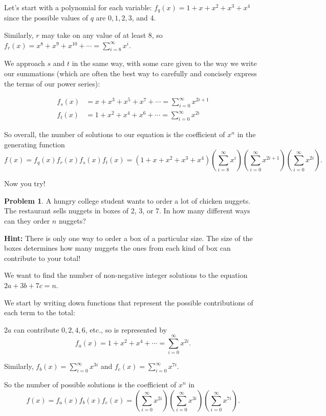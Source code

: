 \documentclass{article}
\theoremstyle{definition}
\newtheorem{problem}{Problem}
\begin{document}
Let's start with a polynomial for each variable: $f_{q}(x)=1+x+x^{2}+x^{3}+x^{4}$ since the possible values of $q$ are $0,1,2,3$, and 4.

Similarly, $r$ may take on any value of at least 8, so $f_{r}(x)=x^{8}+x^{9}+x^{10}+\cdots=\sum_{i=8}^{\infty} x^{i}$.

We approach $s$ and $t$ in the same way, with some care given to the way we write our summations (which are often the best way to carefully and concisely express the terms of our power series):

\begin{align}
f_{s}(x) &= x+x^{3}+x^{5}+x^{7}+\cdots=\sum_{i=0}^{\infty} x^{2 i+1} \\
f_{t}(x) &= 1+x^{2}+x^{4}+x^{6}+\cdots=\sum_{i=0}^{\infty} x^{2 i}
\end{align}

So overall, the number of solutions to our equation is the coefficient of $x^{n}$ in the generating function
\[f(x)=f_{q}(x) f_{r}(x) f_{s}(x) f_{t}(x)=\left(1+x+x^{2}+x^{3}+x^{4}\right)\left(\sum_{i=8}^{\infty} x^{i}\right)\left(\sum_{i=0}^{\infty} x^{2 i+1}\right)\left(\sum_{i=0}^{\infty} x^{2 i}\right).\]

Now you try!

\begin{problem}
A hungry college student wants to order a lot of chicken nuggets. The restaurant sells nuggets in boxes of 2, 3, or 7. In how many different ways can they order $n$ nuggets?

\textbf{Hint:} There is only one way to order a box of a particular size. The size of the boxes determines how many nuggets the ones from each kind of box can contribute to your total!
\end{problem}

We want to find the number of non-negative integer solutions to the equation $2a+3b+7c=n$.

We start by writing down functions that represent the possible contributions of each term to the total:

$2a$ can contribute $0,2,4,6$, etc., so is represented by
\[f_{a}(x)=1+x^{2}+x^{4}+\cdots=\sum_{i=0}^{\infty} x^{2 i}.\]

Similarly, $f_{b}(x)=\sum_{i=0}^{\infty} x^{3 i}$ and $f_{c}(x)=\sum_{i=0}^{\infty} x^{7 i}$.

So the number of possible solutions is the coefficient of $x^{n}$ in
\[f(x)=f_{a}(x) f_{b}(x) f_{c}(x)=\left(\sum_{i=0}^{\infty} x^{2 i}\right)\left(\sum_{i=0}^{\infty} x^{3 i}\right)\left(\sum_{i=0}^{\infty} x^{7 i}\right).\]
\end{document}
